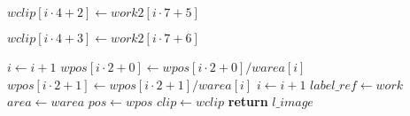 \begin{algorithm}[ht]
\begin{algorithmic}[1]
		\label{alg:arlabeling-calcregiondata-y-start}
			\State $\mathit{wclip}\left[i \cdot 4 + 2\right] \gets \mathit{work2}\left[i \cdot 7 + 5\right]$
		\EndIf

			\State $\mathit{wclip}\left[i \cdot 4 + 3\right] \gets \mathit{work2}\left[i \cdot 7 + 6\right]$
		\EndIf
		\label{alg:arlabeling-calcregiondata-y-end}

		\State $i \gets i + 1$
	\EndFor
	\label{alg:arlabeling-calcregiondata-work-end}
	\label{alg:arlabeling-calcregiondata-pos-start}
		\State $\mathit{wpos}\left[i \cdot 2 + 0\right] \gets \mathit{wpos}\left[i \cdot 2 + 0\right] / \mathit{warea}\left[i\right]$
		\State $\mathit{wpos}\left[i \cdot 2 + 1\right] \gets \mathit{wpos}\left[i \cdot 2 + 1\right] / \mathit{warea}\left[i\right]$
		\State $i \gets i + 1$
	\EndFor
	\label{alg:arlabeling-calcregiondata-pos-end}
	\State $\mathit{label\_ref} \gets \mathit{work}$
	\State $\mathit{area} \gets \mathit{warea}$
	\State $\mathit{pos} \gets \mathit{wpos}$
	\State $\mathit{clip} \gets \mathit{wclip}$
	\State \textbf{return} $\mathit{l\_image}$
\end{algorithmic}
\end{algorithm}
